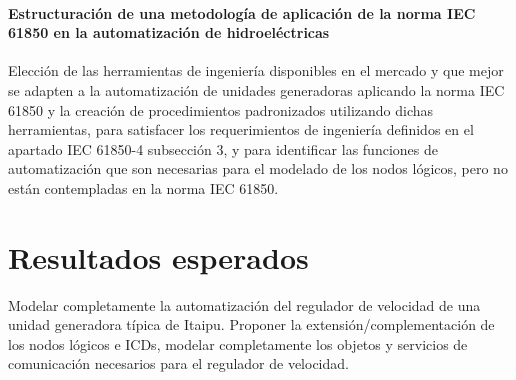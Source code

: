 \documentclass[conference,twocolumn]{IEEEtran}
\begin{document}
	\paragraph{Estructuraci\'on de una metodolog\'ia de aplicaci\'on de la norma IEC 61850 en la automatizaci\'on de hidroel\'ectricas}
		Elecci\'on de las herramientas de ingenier\'ia disponibles en el mercado y que mejor se adapten a la automatizaci\'on de unidades generadoras aplicando la norma IEC 61850 y la creaci\'on de procedimientos padronizados utilizando dichas herramientas, para satisfacer los requerimientos de ingenier\'ia definidos en el apartado IEC 61850-4 subsecci\'on 3, y para identificar las funciones de automatizaci\'on que son necesarias para el modelado de los nodos l\'ogicos, pero no est\'an contempladas en la norma IEC 61850.







\section {Resultados esperados}
Modelar completamente la automatizaci\'on del regulador de velocidad de una unidad generadora t\'ipica de Itaipu. Proponer la extensi\'on/complementaci\'on de los nodos l\'ogicos e ICDs, modelar completamente los objetos y servicios de comunicaci\'on necesarios para el regulador de velocidad.
\end{document}
